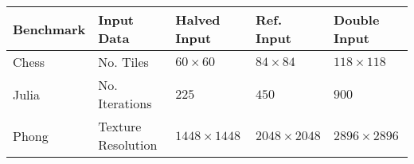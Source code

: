 
\begin{tabular}{lllll}
	Benchmark	& Input Data			& Halved Input		& Ref. Input		& Double Input		\\ \hline
	Chess		& No. Tiles				& $60\times60$		& $84\times84$		& $118\times118$	\\
	Julia		& No. Iterations		& $225$				& $450$				& $900$				\\
	Phong		& Texture Resolution	& $1448\times1448$	& $2048\times2048$	& $2896\times2896$	\\
\end{tabular}
